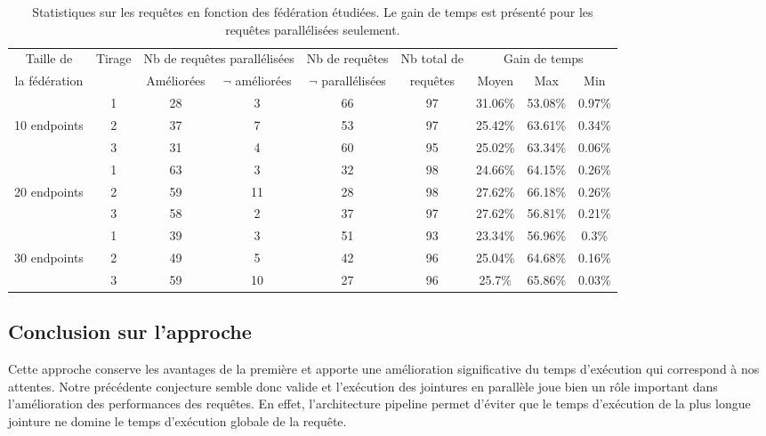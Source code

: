 \documentclass[a4paper]{article}
\begin{document}
\begin{table}[h]
    \begin{tabular}{|c|c|c|c|c|c|c|c|c|}
    \hline
    Taille de & Tirage & \multicolumn{2}{c|}{Nb de requêtes parallélisées} & Nb de requêtes & Nb total de & \multicolumn{3}{c|}{Gain de temps} \\
    \cline{3-4}\cline{7-9}
     la fédération & & Améliorées & $\neg$ améliorées & $\neg$ parallélisées & requêtes & Moyen & Max & Min \\
    \hline
     & 1 & 28 & 3 & 66 & 97 & 31.06\% & 53.08\% & 0.97\% \\
    \cline{2-9}
    10 endpoints & 2 & 37 & 7 & 53 & 97 & 25.42\% & 63.61\% & 0.34\% \\
    \cline{2-9}
     & 3 & 31 & 4 & 60 & 95 & 25.02\% & 63.34\% & 0.06\% \\
    \hline
     & 1 & 63 & 3 & 32 & 98 & 24.66\% & 64.15\% & 0.26\% \\
    \cline{2-9}
    20 endpoints & 2 & 59 & 11 & 28 & 98 & 27.62\% & 66.18\% & 0.26\% \\
    \cline{2-9}
     & 3 & 58 & 2 & 37 & 97 & 27.62\% & 56.81\% & 0.21\% \\
    \hline
     & 1 & 39 & 3 & 51 & 93 & 23.34\% & 56.96\% & 0.3\% \\
    \cline{2-9}
    30 endpoints & 2 & 49 & 5 & 42 & 96 & 25.04\% & 64.68\% & 0.16\% \\
    \cline{2-9}
     & 3 & 59 & 10 & 27 & 96 & 25.7\% & 65.86\% & 0.03\% \\
    \hline
    \end{tabular}
    \caption{Statistiques sur les requêtes en fonction des fédération étudiées. Le gain de temps est présenté pour les requêtes parallélisées seulement.}
    \label{table:stats_pipeline}
\end{table}

\subsection{Conclusion sur l'approche}

Cette approche conserve les avantages de la première et apporte une amélioration significative du temps d'exécution qui correspond à nos attentes. Notre précédente conjecture semble donc valide et l'exécution des jointures en parallèle joue bien un rôle important dans l'amélioration des performances des requêtes. En effet, l'architecture pipeline permet d'éviter que le temps d'exécution de la plus longue jointure ne domine le temps d'exécution globale de la requête.
\end{document}
